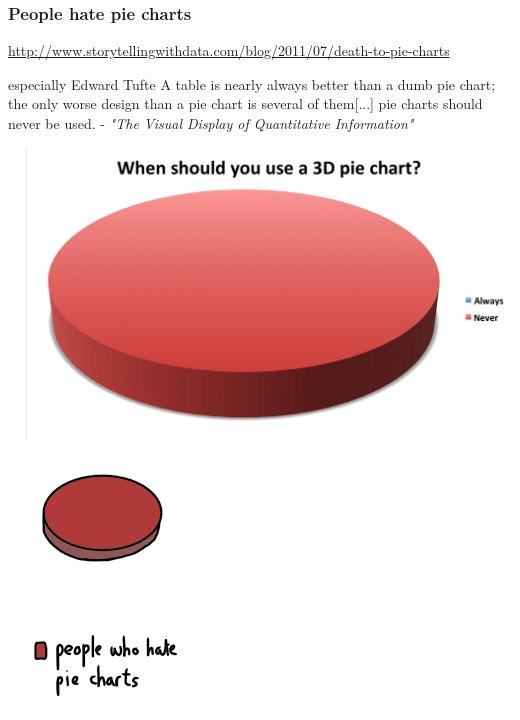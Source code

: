 
\begin{frame}
  \frametitle{People hate pie charts}
    \begin{scriptsize}    
    \href{http://www.storytellingwithdata.com/blog/2011/07/death-to-pie-charts}{http://www.storytellingwithdata.com/blog/2011/07/death-to-pie-charts} \\
    \begin{alertblock}{especially Edward Tufte}
    A table is nearly always better than a dumb pie chart; the only worse design than a pie chart is several of them[...] pie charts should never be used. - \textit{"The Visual Display of Quantitative Information"}
    \end{alertblock}
    \end{scriptsize}
    \begin{center}
      \includegraphics[height=0.5\textheight]{images/3d_pie_chart}
      \includegraphics[height=0.5\textheight]{images/people_hate_pie_charts}
    \end{center}
\end{frame}

